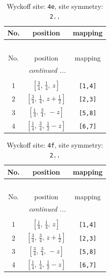 \documentclass[fleqn,8pt]{jsarticle}
\begin{document}
\renewcommand{\arraystretch}{1.2}
\begin{longtable}{ccc}
\caption{Wyckoff site: {\tt 4e}, site symmetry: {\tt 2..}}
 \\
 \hline \hline
No. & position & mapping \\ \hline \endfirsthead

\multicolumn{2}{l}{\tablename\ \thetable{}} \\
 \hline \hline
No. & position & mapping \\ \hline \endhead

 \hline \hline
\multicolumn{2}{r}{\footnotesize\it continued ...} \\ \endfoot

 \hline \hline
\multicolumn{2}{r}{} \\ \endlastfoot

1 & $\left[ \frac{3}{4},\, \frac{1}{4},\, z \right]$ & {\tt [1,4]} \\ \hline
2 & $\left[ \frac{3}{4},\, \frac{1}{4},\, z + \frac{1}{2} \right]$ & {\tt [2,3]} \\ \hline
3 & $\left[ \frac{1}{4},\, \frac{3}{4},\, - z \right]$ & {\tt [5,8]} \\ \hline
4 & $\left[ \frac{1}{4},\, \frac{3}{4},\, \frac{1}{2} - z \right]$ & {\tt [6,7]} \\
\end{longtable}
\renewcommand{\arraystretch}{1.2}
\begin{longtable}{ccc}
\caption{Wyckoff site: {\tt 4f}, site symmetry: {\tt 2..}}
 \\
 \hline \hline
No. & position & mapping \\ \hline \endfirsthead

\multicolumn{2}{l}{\tablename\ \thetable{}} \\
 \hline \hline
No. & position & mapping \\ \hline \endhead

 \hline \hline
\multicolumn{2}{r}{\footnotesize\it continued ...} \\ \endfoot

 \hline \hline
\multicolumn{2}{r}{} \\ \endlastfoot

1 & $\left[ \frac{1}{4},\, \frac{1}{4},\, z \right]$ & {\tt [1,4]} \\ \hline
2 & $\left[ \frac{3}{4},\, \frac{3}{4},\, z + \frac{1}{2} \right]$ & {\tt [2,3]} \\ \hline
3 & $\left[ \frac{3}{4},\, \frac{3}{4},\, - z \right]$ & {\tt [5,8]} \\ \hline
4 & $\left[ \frac{1}{4},\, \frac{1}{4},\, \frac{1}{2} - z \right]$ & {\tt [6,7]} \\
\end{longtable}
\end{document}
